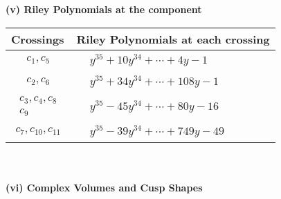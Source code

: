 \documentclass[1p]{elsarticle_modified}
\theoremstyle{definition}
\begin{document}
\newpage\renewcommand{\arraystretch}{1}
\flushleft \textbf{(v) Riley Polynomials at the component}\newline \\
\begin{tabular}{m{50pt}|m{274pt}}
Crossings & \hspace{64pt}Riley Polynomials at each crossing \\
\hline $$\begin{aligned}c_{1},c_{5}\end{aligned}$$&$\begin{aligned}
&y^{35}+10 y^{34}+\cdots+4 y-1
\end{aligned}$\\
\hline $$\begin{aligned}c_{2},c_{6}\end{aligned}$$&$\begin{aligned}
&y^{35}+34 y^{34}+\cdots+108 y-1
\end{aligned}$\\
\hline $$\begin{aligned}c_{3},c_{4},c_{8}\\c_{9}\end{aligned}$$&$\begin{aligned}
&y^{35}-45 y^{34}+\cdots+80 y-16
\end{aligned}$\\
\hline $$\begin{aligned}c_{7},c_{10},c_{11}\end{aligned}$$&$\begin{aligned}
&y^{35}-39 y^{34}+\cdots+749 y-49
\end{aligned}$\\
\hline
\end{tabular}\\~\\
\newpage\flushleft \textbf{(vi) Complex Volumes and Cusp Shapes}
\end{document}
